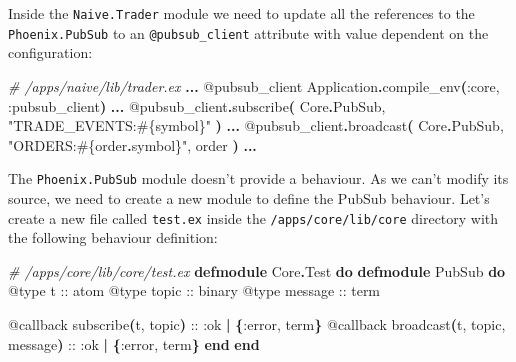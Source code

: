 \documentclass[
  oneside]{book}
\newenvironment{Shaded}{\begin{snugshade}}{\end{snugshade}}
\newcommand{\CommentTok}[1]{\textcolor[rgb]{0.56,0.35,0.01}{\textit{#1}}}
\newcommand{\ConstantTok}[1]{\textcolor[rgb]{0.56,0.35,0.01}{#1}}
\newcommand{\FunctionTok}[1]{\textcolor[rgb]{0.13,0.29,0.53}{\textbf{#1}}}
\newcommand{\KeywordTok}[1]{\textcolor[rgb]{0.13,0.29,0.53}{\textbf{#1}}}
\newcommand{\NormalTok}[1]{#1}
\newcommand{\OperatorTok}[1]{\textcolor[rgb]{0.81,0.36,0.00}{\textbf{#1}}}
\newcommand{\OtherTok}[1]{\textcolor[rgb]{0.56,0.35,0.01}{#1}}
\newcommand{\StringTok}[1]{\textcolor[rgb]{0.31,0.60,0.02}{#1}}
\newcommand{\VariableTok}[1]{\textcolor[rgb]{0.00,0.00,0.00}{#1}}
\begin{document}
Inside the \texttt{Naive.Trader} module we need to update all the references to the \texttt{Phoenix.PubSub} to an \texttt{@pubsub\_client} attribute with value dependent on the configuration:

\begin{Shaded}
\begin{Highlighting}[]
\CommentTok{\# /apps/naive/lib/trader.ex}
  \OperatorTok{...}
  \OtherTok{@pubsub\_client} \ConstantTok{Application}\OperatorTok{.}\NormalTok{compile\_env}\FunctionTok{(}\VariableTok{:core}\NormalTok{, }\VariableTok{:pubsub\_client}\FunctionTok{)}
  \OperatorTok{...}
    \OtherTok{@pubsub\_client}\OperatorTok{.}\NormalTok{subscribe}\FunctionTok{(}
      \ConstantTok{Core}\OperatorTok{.}\ConstantTok{PubSub}\NormalTok{,}
      \StringTok{"TRADE\_EVENTS:}\OtherTok{\#\{}\NormalTok{symbol}\OtherTok{\}}\StringTok{"}
    \FunctionTok{)}
  \OperatorTok{...}
    \OtherTok{@pubsub\_client}\OperatorTok{.}\NormalTok{broadcast}\FunctionTok{(}
      \ConstantTok{Core}\OperatorTok{.}\ConstantTok{PubSub}\NormalTok{,}
      \StringTok{"ORDERS:}\OtherTok{\#\{}\NormalTok{order}\OperatorTok{.}\NormalTok{symbol}\OtherTok{\}}\StringTok{"}\NormalTok{,}
\NormalTok{      order}
    \FunctionTok{)}
  \OperatorTok{...}
\end{Highlighting}
\end{Shaded}

The \texttt{Phoenix.PubSub} module doesn't provide a behaviour. As we can't modify its source, we need to create a new module to define the PubSub behaviour. Let's create a new file called \texttt{test.ex} inside the \texttt{/apps/core/lib/core} directory with the following behaviour definition:

\begin{Shaded}
\begin{Highlighting}[]
\CommentTok{\# /apps/core/lib/core/test.ex}
\KeywordTok{defmodule} \ConstantTok{Core}\OperatorTok{.}\ConstantTok{Test} \KeywordTok{do}
  \KeywordTok{defmodule} \ConstantTok{PubSub} \KeywordTok{do}
    \OtherTok{@type}\NormalTok{ t :: atom}
    \OtherTok{@type}\NormalTok{ topic :: binary}
    \OtherTok{@type}\NormalTok{ message :: term}

    \OtherTok{@callback}\NormalTok{ subscribe}\FunctionTok{(}\NormalTok{t, topic}\FunctionTok{)}\NormalTok{ :: }\VariableTok{:ok} \OperatorTok{|} \FunctionTok{\{}\VariableTok{:error}\NormalTok{, term}\FunctionTok{\}}
    \OtherTok{@callback}\NormalTok{ broadcast}\FunctionTok{(}\NormalTok{t, topic, message}\FunctionTok{)}\NormalTok{ :: }\VariableTok{:ok} \OperatorTok{|} \FunctionTok{\{}\VariableTok{:error}\NormalTok{, term}\FunctionTok{\}}
  \KeywordTok{end}
\KeywordTok{end}
\end{Highlighting}
\end{Shaded}
\end{document}
